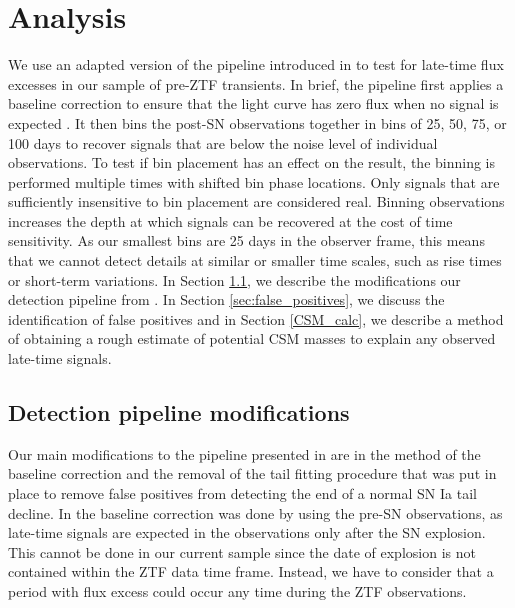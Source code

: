 \documentclass[a4paper,oneside,12pt, class=Latex/Classes/PhDthesisPSnPDF, crop=false]{standalone}
\begin{document}
\section{Analysis}
\label{analysis}
We use an adapted version of the pipeline introduced in \citet{Terwel_2024_paper1} to test for late-time flux excesses in our sample of pre-ZTF transients. In brief, the pipeline first applies a baseline correction to ensure that the light curve has zero flux when no signal is expected \citep[e.g.][]{Yao_baseline_corr,Miller_baseline_corr}. It then bins the post-SN observations together in bins of 25, 50, 75, or 100 days to recover signals that are below the noise level of individual observations. To test if bin placement has an effect on the result, the binning is performed multiple times with shifted bin phase locations. Only signals that are sufficiently insensitive to bin placement are considered real. Binning observations increases the depth at which signals can be recovered at the cost of time sensitivity. As our smallest bins are 25 days in the observer frame, this means that we cannot detect details at similar or smaller time scales, such as rise times or short-term variations. In Section \ref{sec:Pipeline_modifications}, we describe the modifications our detection pipeline from \cite{Terwel_2024_paper1}. In Section \ref{sec:false_positives}, we discuss the identification of false positives and in Section \ref{CSM_calc}, we describe a method of obtaining a rough estimate of potential CSM masses to explain any observed late-time signals.

\subsection{Detection pipeline modifications}
\label{sec:Pipeline_modifications}
Our main modifications to the pipeline presented in  \citet{Terwel_2024_paper1} are in the method of the baseline correction and the removal of the tail fitting procedure that was put in place to remove false positives from detecting the end of a normal SN Ia tail decline. In \citet{Terwel_2024_paper1} the baseline correction was done by using the pre-SN observations, as late-time signals are expected in the observations only after the SN explosion. This cannot be done in our current sample since the date of explosion is not contained within the ZTF data time frame. Instead, we have to consider that a period with flux excess could occur any time during the ZTF observations. 
\end{document}
